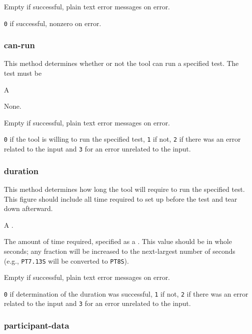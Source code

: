 \documentclass[10pt,titlepage]{article}
\begin{document}
 Empty if successful, plain text error
messages on error.

 {\tt 0} if successful, nonzero on error.



\subsubsection{can-run}
This method determines whether or not the tool can run a specified test.  The test must be 

 A 

 None.

 Empty if successful, plain text error
messages on error.

 {\tt 0} if the tool is willing to run the
specified test, {\tt 1} if not, {\tt 2} if there was an error related
to the input and {\tt 3} for an error unrelated to the input.



\subsubsection{duration}

This method determines how long the tool will require to run the
specified test.  This figure should include all time required to set
up before the test and tear down afterward.

 A .

 The amount of time required, specified
as a .  This value should be in whole seconds; any
fraction will be increased to the next-largest number of seconds
(e.g., {\tt PT7.13S} will be converted to {\tt PT8S}).

 Empty if successful, plain text error
messages on error.

 {\tt 0} if determination of the duration was
successful, {\tt 1} if not, {\tt 2} if there was an error related to
the input and {\tt 3} for an error unrelated to the input.



\subsubsection{participant-data}
\end{document}
